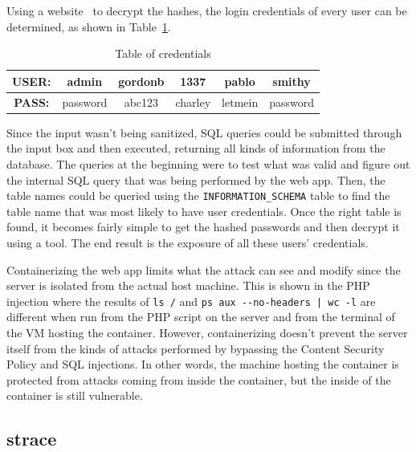 \documentclass[11pt]{article}
\begin{document}
Using a website~\cite{md5} to decrypt the hashes, the login credentials of every user can be determined, as shown in Table~\ref{table:creds}.
\begin{table}[h]
  \centering
  \begin{tabular}{ |c|c|c|c|c|c| }
    \hline
    \textbf{USER:} & admin    & gordonb & 1337    & pablo   & smithy   \\ \hline
    \textbf{PASS:} & password & abc123  & charley & letmein & password \\ \hline
  \end{tabular}
  \caption{\label{table:creds}
  Table of credentials}
\end{table}
Since the input wasn't being sanitized, SQL queries could be submitted through the input box and then executed, returning all kinds
of information from the database. The queries at the beginning were to test what was valid and figure out the internal SQL query
that was being performed by the web app. Then, the table names could be queried using the \verb|INFORMATION_SCHEMA| table to find
the table name that was most likely to have user credentials. Once the right table is found, it becomes fairly simple to get the
hashed passwords and then decrypt it using a tool. The end result is the exposure of all these users' credentials.

Containerizing the web app limits what the attack can see and modify since the server is isolated from the actual host machine. This
is shown in the PHP injection where the results of \verb|ls /| and \verb=ps aux --no-headers | wc -l= are different when run from
the PHP script on the server and from the terminal of the VM hosting the container. However, containerizing doesn't prevent the
server itself from the kinds of attacks performed by bypassing the Content Security Policy and SQL injections. In other words,
the machine hosting the container is protected from attacks coming from inside the container, but the inside of the container is
still vulnerable.
\subsection*{strace}



\end{document}
